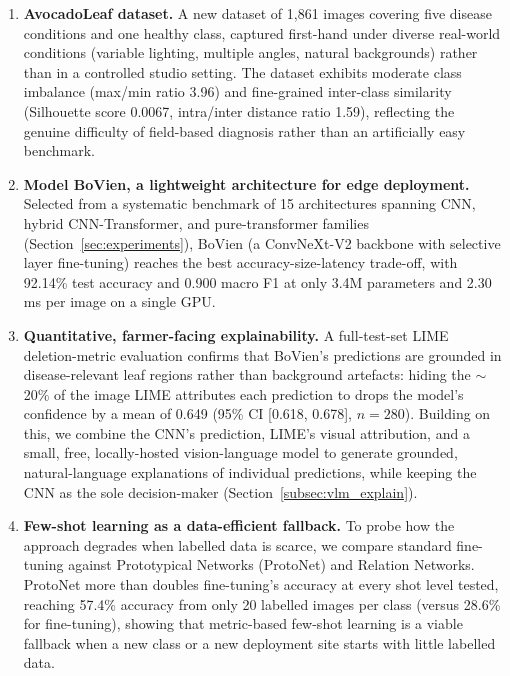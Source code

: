 \begin{enumerate}
    \item \textbf{AvocadoLeaf dataset.} A new dataset of 1,861 images covering five disease conditions and one healthy class, captured first-hand under diverse real-world conditions (variable lighting, multiple angles, natural backgrounds) rather than in a controlled studio setting. The dataset exhibits moderate class imbalance (max/min ratio 3.96) and fine-grained inter-class similarity (Silhouette score 0.0067, intra/inter distance ratio 1.59), reflecting the genuine difficulty of field-based diagnosis rather than an artificially easy benchmark.

    \item \textbf{Model BoVien, a lightweight architecture for edge deployment.} Selected from a systematic benchmark of 15 architectures spanning CNN, hybrid CNN-Transformer, and pure-transformer families (Section~\ref{sec:experiments}), BoVien (a ConvNeXt-V2 backbone with selective layer fine-tuning) reaches the best accuracy-size-latency trade-off, with 92.14\% test accuracy and 0.900 macro F1 at only 3.4M parameters and 2.30\,ms per image on a single GPU.

    \item \textbf{Quantitative, farmer-facing explainability.} A full-test-set LIME deletion-metric evaluation confirms that BoVien's predictions are grounded in disease-relevant leaf regions rather than background artefacts: hiding the $\sim$20\% of the image LIME attributes each prediction to drops the model's confidence by a mean of 0.649 (95\% CI [0.618, 0.678], $n=280$). Building on this, we combine the CNN's prediction, LIME's visual attribution, and a small, free, locally-hosted vision-language model to generate grounded, natural-language explanations of individual predictions, while keeping the CNN as the sole decision-maker (Section~\ref{subsec:vlm_explain}).

    \item \textbf{Few-shot learning as a data-efficient fallback.} To probe how the approach degrades when labelled data is scarce, we compare standard fine-tuning against Prototypical Networks (ProtoNet) and Relation Networks. ProtoNet more than doubles fine-tuning's accuracy at every shot level tested, reaching 57.4\% accuracy from only 20 labelled images per class (versus 28.6\% for fine-tuning), showing that metric-based few-shot learning is a viable fallback when a new class or a new deployment site starts with little labelled data.


\end{enumerate}
